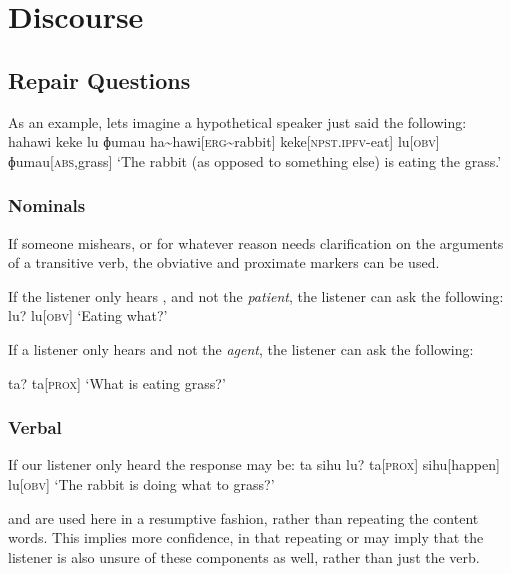 
\chapter{Discourse}

\section{Repair Questions}
As an example, lets imagine a hypothetical speaker just said the following:
\ex
\begingl
\glpreamble hahawi keke lu ɸumau
\endpreamble
ha\textasciitilde hawi[\textsc{erg\textasciitilde}rabbit]
keke[\textsc{npst.ipfv-}eat]
lu[\textsc{obv}]
ɸumau[\textsc{abs,}grass]
\glft `The rabbit (as opposed to something else) is eating the grass.'
\endgl
\xe

\subsection{Nominals}

If someone mishears, or for whatever reason needs clarification on the arguments of a transitive verb, the obviative and proximate markers can be used.

If the listener only hears , and not the \textit{patient}, the listener can ask the following:
\ex
\begingl
\glpreamble lu?
\endpreamble
lu[\textsc{obv}]
\glft `Eating what?'
\endgl
\xe

If a listener only hears  and not the \textit{agent}, the listener can ask the following:

\ex
\begingl
\glpreamble ta?
\endpreamble
ta[\textsc{prox}]
\glft `What is eating grass?'
\endgl
\xe

\subsection{Verbal}
If our listener only heard  the response may be:
\ex
\begingl
\glpreamble ta sihu lu?
\endpreamble
ta[\textsc{prox}]
sihu[happen]
lu[\textsc{obv}]
\glft `The rabbit is doing what to grass?'
\endgl
\xe

 and  are used here in a resumptive fashion, rather than repeating the content words.
This implies more confidence, in that repeating  or  may imply that the listener is also unsure of these components as well, rather than just the verb.

